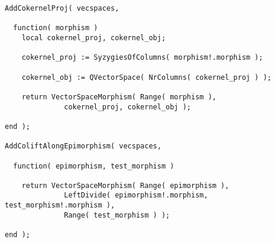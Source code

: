 \begin{small}
\begin{Verbatim}[frame=single]
AddCokernelProj( vecspaces,

  function( morphism )
    local cokernel_proj, cokernel_obj;

    cokernel_proj := SyzygiesOfColumns( morphism!.morphism );

    cokernel_obj := QVectorSpace( NrColumns( cokernel_proj ) );

    return VectorSpaceMorphism( Range( morphism ), 
              cokernel_proj, cokernel_obj );

end );

AddColiftAlongEpimorphism( vecspaces,
  
  function( epimorphism, test_morphism )
    
    return VectorSpaceMorphism( Range( epimorphism ),
              LeftDivide( epimorphism!.morphism, test_morphism!.morphism ),
              Range( test_morphism ) );
    
end );
\end{Verbatim}
\end{small}